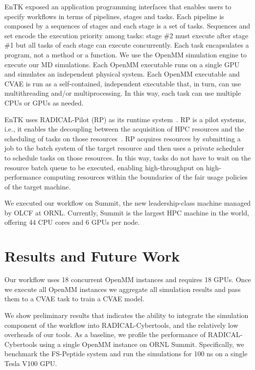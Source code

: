 \documentclass[conference,final]{IEEEtran}
\begin{document}
EnTK exposed an application programming interfaces that enables users to
specify workflows in terms of pipelines, stages and tasks. Each pipeline is
composed by a sequences of stages and each stage is a set of tasks. Sequences
and set encode the execution priority among tasks: stage \#2 must execute
after stage \#1 but all tasks of each stage can execute concurrently. Each
task encapsulates a program, not a method or a function. We use the OpenMM
simulation engine to execute our MD simulations. Each OpenMM executable runs
on a single GPU and simulates an independent physical system. Each OpenMM
executable and CVAE is run as a self-contained, independent executable that,
in turn, can use multithreading and/or multiprocessing. In this way, each
task can use multiple CPUs or GPUs as needed.

EnTK uses RADICAL-Pilot (RP) as its runtime system~\cite{merzky2018using}. RP
is a pilot systems, i.e., it enables the decoupling between the acquisition
of HPC resources and the scheduling of tasks on those
resources~\cite{turilli2018comprehensive}. RP acquires resources by
submitting a job to the batch system of the target resource and then uses a
private scheduler to schedule tasks on those resources. In this way, tasks do
not have to wait on the resource batch queue to be executed, enabling
high-throughput on high-performance computing resources within the boundaries
of the fair usage policies of the target machine.

We executed our workflow on Summit, the new leadership-class machine managed
by OLCF at ORNL\@. Currently, Summit is the largest HPC machine in the world,
offering 44 CPU cores and 6 GPUs per node.


\section{Results and Future Work}

Our workflow uses 18 concurrent OpenMM instances and requires 18 GPUs. Once
we execute all OpenMM instances we aggregate all simulation results and pass
them to a CVAE task %
to train a CVAE model.

We show preliminary results that indicates the ability to integrate the
simulation component of the workflow into RADICAL-Cybertools, and the
relatively low overheads of our tools.  As a baseline, we profile the
performance of RADICAL-Cybertools using a single OpenMM instance on ORNL
Summit. Specifically, we benchmark the FS-Peptide system and run the
simulations for 100 ns on a single Tesla V100 GPU. 
\end{document}
